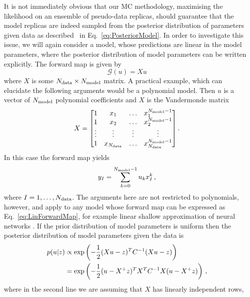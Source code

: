 It is not immediately obvious that our MC methodology, maximising the likelihood
on an ensemble of pseudo-data replicas, should guarantee that the model replicas
are indeed sampled from the posterior distribution of parameters given data as
described \eg\ in Eq.~\ref{eq:PosteriorModel}. In order to investigate this
issue, we will again consider a model, whose predictions are linear in the model
parameters, where the posterior distribution of model parameters can be written
explicitly. The forward map is given by
\begin{equation}\label{eq:LinForwardMap}
    \mathcal G(u) = X u
\end{equation}
where $X$ is some $N_{\rm data}\times N_{\rm model}$ matrix. A practical example, which can
elucidate the following arguments would be a polynomial model. Then $u$ is a
vector of $N_{\rm model}$ polynomial coefficients and $X$ is the Vandermonde matrix
\begin{equation}
    X =
    \begin{bmatrix}
        1  & x_1 & \ldots& x_1^{N_{\rm model}-1} \\ 
        1  & x_2 & \ldots& x_2^{N_{\rm model}-1} \\ 
        \vdots  & \vdots & \vdots& \vdots \\ 
        1  & x_{N_{\rm data}} & \ldots & x_{N_{\rm data}}^{N_{\rm model}-1} 
    \end{bmatrix}.
\end{equation}
In this case the forward map yields
\begin{equation}
    \label{eq:PolyMod}
    y_I = \sum_{k=0}^{N_{\rm model}-1} u_k x_I^k\, , 
\end{equation}
where $I=1,\ldots,N_{\rm data}$. The arguments here are not restricted to polynomials,
however, and apply to any model whose forward map can be expressed as
Eq.~\eqref{eq:LinForwardMap}, for example linear shallow approximation of neural
networks \cite{ADVANI2020428}. If the prior distribution of model parameters is
uniform then the posterior distribution of model parameters given the data is
\begin{equation}
    \label{eq:PosteriorMultiGaussModel}
    \begin{split}
        p(u | z) &\propto
        \exp \left( -\frac{1}{2} (Xu - z)^T C^{-1}_{} (Xu - z)\right) \\
        &= \exp \left( -\frac{1}{2} (u - X^+z)^T X^TC^{-1}_{}X (u - X^+z)\right)\, ,
    \end{split}
\end{equation}
where in the second line we are assuming that $X$ has linearly independent rows,

